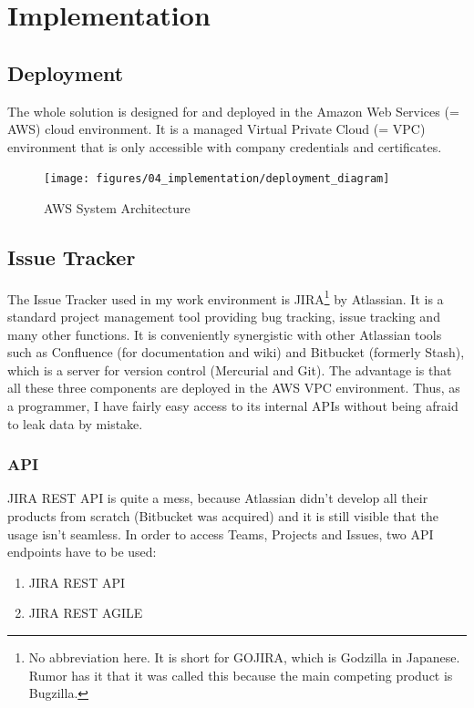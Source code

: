 \chapter{Implementation}

\section{Deployment}

The whole solution is designed for and deployed in the Amazon Web Services (= AWS) cloud environment. It is a managed Virtual Private Cloud (= VPC) environment that is only accessible with company credentials and certificates.

\begin{figure}[!ht]
	\centering
	\texttt{[image: figures/04\_implementation/deployment\_diagram]}
    \caption{AWS System Architecture}
\end{figure}

\section{Issue Tracker}

The Issue Tracker used in my work environment is JIRA\footnote{No abbreviation here. It is short for GOJIRA, which is Godzilla in Japanese. Rumor has it that it was called this because the main competing product is Bugzilla.} by Atlassian. It is a standard project management tool providing bug tracking, issue tracking and many other functions. It is conveniently synergistic with other Atlassian tools such as Confluence (for documentation and wiki) and Bitbucket (formerly Stash), which is a server for version control (Mercurial and Git). The advantage is that all these three components are deployed in the AWS VPC environment. Thus, as a programmer, I have fairly easy access to its internal APIs without being afraid to leak data by mistake.

\subsection{API}

JIRA REST API is quite a mess, because Atlassian didn't develop all their products from scratch (Bitbucket was acquired) and it is still visible that the usage isn't seamless. In order to access Teams, Projects and Issues, two API endpoints have to be used:

\begin{enumerate}
	\item JIRA REST API
	\item JIRA REST AGILE
\end{enumerate}

